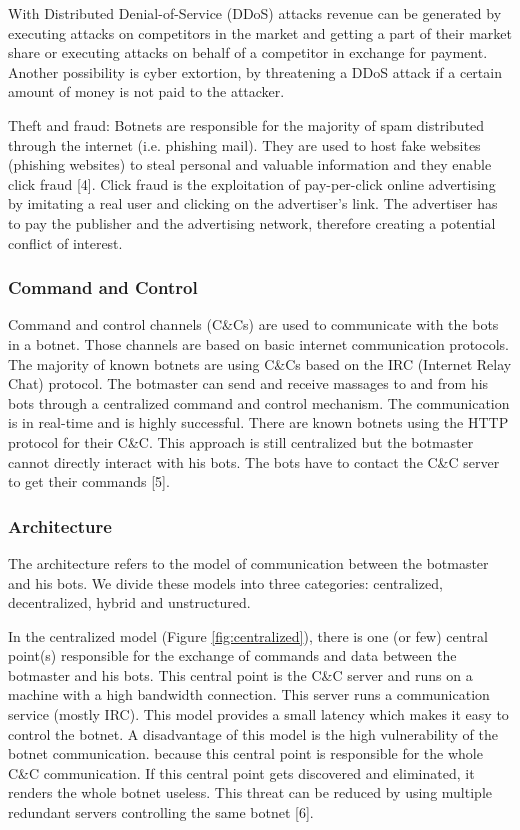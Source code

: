 With Distributed Denial-of-Service (DDoS) attacks revenue can be generated by executing attacks on competitors in the market and getting a part of their market share or executing attacks on behalf of a competitor in exchange for payment.
Another possibility is cyber extortion, by threatening a DDoS attack if a certain amount of money is not paid to the attacker.

Theft and fraud: Botnets are responsible for the majority of spam distributed through the internet (i.e. phishing mail). They are used to host fake websites (phishing websites) to steal personal and valuable information and they enable click fraud [4]. Click fraud is the exploitation of pay-per-click online advertising by imitating a real user and clicking on the advertiser's link. The advertiser has to pay the publisher and the advertising network, therefore creating a potential conflict of interest.

		\subsubsection{Command and Control}
Command and control channels (C\&Cs) are used to communicate with the bots in a botnet. Those channels are based on basic internet communication protocols. The majority of known botnets are using C\&Cs based on the IRC (Internet Relay Chat) protocol. The botmaster can send and receive massages to and from his bots through a centralized command and control mechanism. The communication is in real-time and is highly successful. There are known botnets using the HTTP protocol for their C\&C. This approach is still centralized but the botmaster cannot directly interact with his bots. The bots have to contact the C\&C server to get their commands [5].

		\subsubsection{Architecture}
The architecture refers to the model of communication between the botmaster and his bots. We divide these models into three categories: centralized, decentralized, hybrid and unstructured.

In the centralized model (Figure \ref{fig:centralized}), there is one (or few) central point(s) responsible for the exchange of commands and data between the botmaster and his bots. This central point is the C\&C server and runs on a machine with a high bandwidth connection. This server runs a communication service (mostly IRC). This model provides a small latency which makes it easy to control the botnet. A disadvantage of this model is the high vulnerability of the botnet communication. because this central point is responsible for the whole C\&C communication. If this central point gets discovered and eliminated, it renders the whole botnet useless. This threat can be reduced by using multiple redundant servers controlling the same botnet [6].

